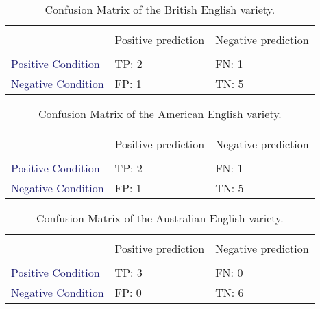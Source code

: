 \documentclass[
12pt,
a4paper,
oneside,
headinclude,
footinclude]{article}
\theoremstyle{definition} %
\begin{document}
\begin{table}[h]
    \centering %
    \begin{tabular}{l l l} %
        \hline
        \hline 
        \\[-1.5ex]
         & \textcolor{BrickRed}{Positive prediction} & \textcolor{BrickRed}{Negative prediction}\\ [0.5ex]
        \hline %
        \\[-1.5ex]
        \textcolor{MidnightBlue}{Positive Condition} & TP: 2 & FN: 1 \\ 
        \textcolor{MidnightBlue}{Negative Condition} & FP: 1 & TN: 5 \\[1ex] %
        \hline %
    \end{tabular}
    \caption{\label{tab:table-conf-gb}Confusion Matrix of the British English variety.}
\end{table} 

\begin{table}[h]
    \centering %
    \begin{tabular}{l l l} %
        \hline
        \hline 
        \\[-1.5ex]
        & \textcolor{BrickRed}{Positive prediction} & \textcolor{BrickRed}{Negative prediction}\\ [0.5ex]
        \hline %
        \\[-1.5ex]
        \textcolor{MidnightBlue}{Positive Condition} & TP: 2 & FN: 1 \\ 
        \textcolor{MidnightBlue}{Negative Condition} & FP: 1 & TN: 5 \\[1ex] %
        \hline %
    \end{tabular}
    \caption{\label{tab:table-conf-us}Confusion Matrix of the American English variety.}
\end{table} 

\begin{table}[h]
    \centering %
    \begin{tabular}{l l l} %
        \hline
        \hline 
        \\[-1.5ex]
        & \textcolor{BrickRed}{Positive prediction} & \textcolor{BrickRed}{Negative prediction}\\ [0.5ex]
        \hline %
        \\[-1.5ex]
        \textcolor{MidnightBlue}{Positive Condition} & TP: 3 & FN: 0 \\ 
        \textcolor{MidnightBlue}{Negative Condition} & FP: 0 & TN: 6 \\[1ex] %
        \hline %
    \end{tabular}
    \caption{\label{tab:table-conf-au}Confusion Matrix of the Australian English variety.}
\end{table} 
\end{document}
